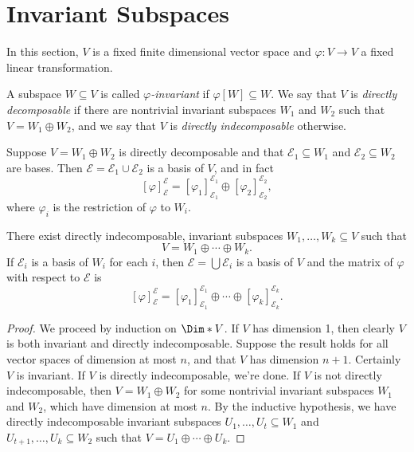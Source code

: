 \documentclass{memoir}
\begin{document}
\setcounter{section}{14}
\section{Invariant Subspaces}

In this section, $V$ is a fixed finite dimensional vector space and $\varphi : V \rightarrow V$ a fixed linear transformation.

\begin{dfn}
A subspace $W \subseteq V$ is called \emph{$\varphi$-invariant} if $\varphi[W] \subseteq W$. We say that $V$ is \emph{directly decomposable} if there are nontrivial invariant subspaces $W_1$ and $W_2$ such that $V = W_1 \oplus W_2$, and we say that $V$ is \emph{directly indecomposable} otherwise.
\end{dfn}

\begin{prp}
Suppose $V = W_1 \oplus W_2$ is directly decomposable and that $\mathcal{E}_1 \subseteq W_1$ and $\mathcal{E}_2 \subseteq W_2$ are bases. Then $\mathcal{E} = \mathcal{E}_1 \cup \mathcal{E}_2$ is a basis of $V$, and in fact \[ [\varphi]^\mathcal{E}_\mathcal{E} = [\varphi_1]^{\mathcal{E}_1}_{\mathcal{E}_1} \oplus [\varphi_2]^{\mathcal{E}_2}_{\mathcal{E}_2}, \] where $\varphi_i$ is the restriction of $\varphi$ to $W_i$.
\end{prp}

\begin{prp}
There exist directly indecomposable, invariant subspaces $W_1,\ldots,W_k \subseteq V$ such that \[V = W_1 \oplus \cdots \oplus W_k.\] If $\mathcal{E}_i$ is a basis of $W_i$ for each $i$, then $\mathcal{E} = \bigcup \mathcal{E}_i$ is a basis of $V$ and the matrix of $\varphi$ with respect to $\mathcal{E}$ is \[ [\varphi]^\mathcal{E}_\mathcal{E} = [\varphi_1]^{\mathcal{E}_1}_{\mathcal{E}_1} \oplus \cdots \oplus [\varphi_k]^{\mathcal{E}_k}_{\mathcal{E}_k}. \]
\end{prp}

\begin{proof}
We proceed by induction on $\Dim*{V}$. If $V$ has dimension 1, then clearly $V$ is both invariant and directly indecomposable. Suppose the result holds for all vector spaces of dimension at most $n$, and that $V$ has dimension $n+1$. Certainly $V$ is invariant. If $V$ is directly indecomposable, we're done. If $V$ is not directly indecomposable, then $V = W_1 \oplus W_2$ for some nontrivial invariant subspaces $W_1$ and $W_2$, which have dimension at most $n$. By the inductive hypothesis, we have directly indecomposable invariant subspaces $U_1,\ldots,U_t \subseteq W_1$ and $U_{t+1},\ldots,U_k \subseteq W_2$ such that $V = U_1 \oplus \cdots \oplus U_k$.
\end{proof}
\end{document}
